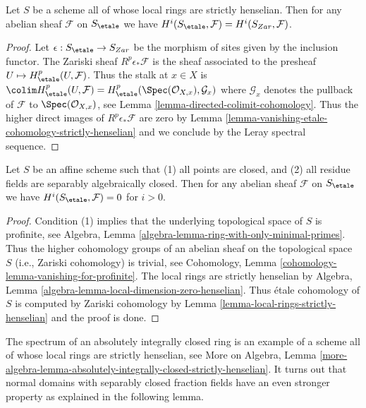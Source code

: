 \begin{lemma}
\label{lemma-local-rings-strictly-henselian}
Let $S$ be a scheme all of whose local rings are strictly henselian.
Then for any abelian sheaf $\mathcal{F}$ on $S_\etale$ we have
$H^i(S_\etale, \mathcal{F}) = H^i(S_{Zar}, \mathcal{F})$.
\end{lemma}

\begin{proof}
Let $\epsilon : S_\etale \to S_{Zar}$ be the morphism of sites given
by the inclusion functor. The Zariski sheaf $R^p\epsilon_*\mathcal{F}$
is the sheaf associated to the presheaf $U \mapsto H^p_\etale(U, \mathcal{F})$.
Thus the stalk at $x \in X$ is
$\colim H^p_\etale(U, \mathcal{F}) =
H^p_\etale(\Spec(\mathcal{O}_{X, x}), \mathcal{G}_x)$
where $\mathcal{G}_x$ denotes the pullback of $\mathcal{F}$
to $\Spec(\mathcal{O}_{X, x})$, see
Lemma \ref{lemma-directed-colimit-cohomology}.
Thus the higher direct images of $R^p\epsilon_*\mathcal{F}$ are
zero by
Lemma \ref{lemma-vanishing-etale-cohomology-strictly-henselian}
and we conclude by the Leray spectral sequence.
\end{proof}

\begin{lemma}
\label{lemma-affine-only-closed-points}
Let $S$ be an affine scheme such that
(1) all points are closed, and (2) all residue fields are separably
algebraically closed. Then
for any abelian sheaf $\mathcal{F}$ on $S_\etale$ we have
$H^i(S_\etale, \mathcal{F}) = 0$ for $i > 0$.
\end{lemma}

\begin{proof}
Condition (1) implies that the underlying topological space
of $S$ is profinite, see
Algebra, Lemma \ref{algebra-lemma-ring-with-only-minimal-primes}.
Thus the higher cohomology groups of an abelian sheaf on the topological
space $S$ (i.e., Zariski cohomology) is trivial, see
Cohomology, Lemma \ref{cohomology-lemma-vanishing-for-profinite}.
The local rings are strictly henselian by
Algebra, Lemma \ref{algebra-lemma-local-dimension-zero-henselian}.
Thus \'etale cohomology of $S$ is computed by Zariski cohomology
by Lemma \ref{lemma-local-rings-strictly-henselian}
and the proof is done.
\end{proof}

\noindent
The spectrum of an absolutely integrally closed ring
is an example of a scheme all of whose local rings are
strictly henselian, see More on Algebra, Lemma
\ref{more-algebra-lemma-absolutely-integrally-closed-strictly-henselian}.
It turns out that normal domains with separably closed fraction
fields have an even stronger property as explained in the
following lemma.

